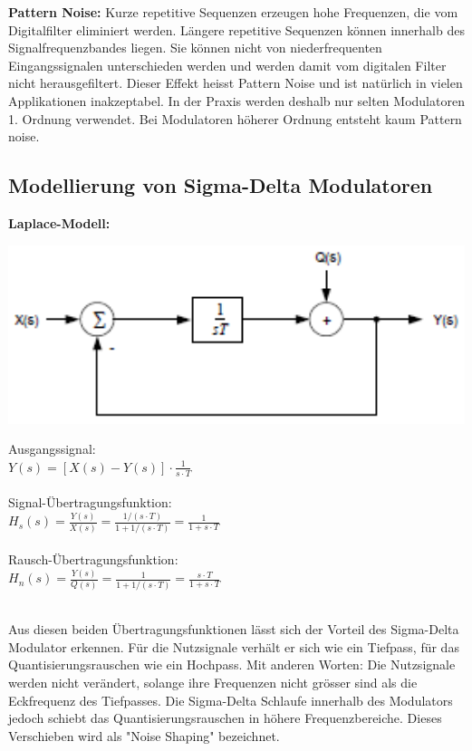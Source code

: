 \textbf{Pattern Noise:} Kurze repetitive Sequenzen erzeugen hohe Frequenzen, die vom Digitalfilter eliminiert werden. Längere repetitive Sequenzen können innerhalb des Signalfrequenzbandes liegen. Sie können nicht von niederfrequenten Eingangssignalen unterschieden werden und werden damit vom digitalen Filter nicht herausgefiltert.
Dieser Effekt heisst Pattern Noise und ist natürlich in vielen Applikationen inakzeptabel. In der Praxis werden deshalb nur selten Modulatoren 1. Ordnung verwendet. Bei Modulatoren höherer Ordnung entsteht kaum Pattern noise.

\subsection{Modellierung von Sigma-Delta Modulatoren}
\textbf{Laplace-Modell:}\\
\begin{minipage}{0.45\textwidth}
    \includegraphics[width=1.0\textwidth]{images/SigmaDeltaLaplace}
\end{minipage}
\hfill
\begin{minipage}{0.45\textwidth}
   Ausgangssignal:\\ $Y(s)=[X(s)-Y(s)]\cdot \frac{1}{s \cdot T}$\\\\
   Signal-Übertragungsfunktion:\\ $H_{s}(s)=\frac{Y(s)}{X(s)}=\frac{1/(s \cdot T)}{1+1/(s\cdot T)} = \frac{1}{1+s\cdot T}$\\\\
   Rausch-Übertragungsfunktion:\\
   $H_{n}(s)=\frac{Y(s)}{Q(s)}=\frac{1}{1+1/(s\cdot T)} = \frac{s \cdot T}{1+ s \cdot T}$
\end{minipage}\\
Aus diesen beiden Übertragungsfunktionen lässt sich der Vorteil des Sigma-Delta Modulator erkennen. Für die Nutzsignale verhält er sich wie ein Tiefpass, für das Quantisierungsrauschen wie ein Hochpass. Mit anderen Worten: Die Nutzsignale werden nicht verändert, solange ihre Frequenzen nicht grösser sind als die Eckfrequenz des Tiefpasses. Die Sigma-Delta Schlaufe innerhalb des Modulators jedoch schiebt das Quantisierungsrauschen in höhere Frequenzbereiche. Dieses Verschieben wird als "Noise Shaping" bezeichnet.\\ \ \\
